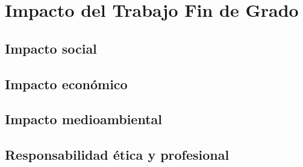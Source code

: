 \chapter{Impacto del Trabajo Fin de Grado}

\section{Impacto social}

\section{Impacto económico}

\section{Impacto medioambiental}

\section{Responsabilidad ética y profesional}

\clearpage
\newpage
